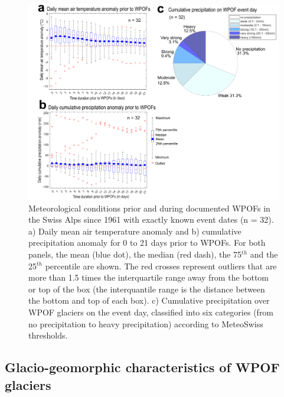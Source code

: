 \begin{figure}
    \centering
    \includegraphics[width=1\linewidth]{chapters/chapter_WPOFs/meteo_anomaly.pdf}
    \caption{Meteorological conditions prior and during documented WPOFs in the Swiss Alps since 1961 with exactly known event dates (n = 32). a) Daily mean air temperature anomaly and b) cumulative precipitation anomaly for 0 to 21 days prior to WPOFs. For both panels, the mean (blue dot), the median (red dash), the 75$^{th}$ and the 25$^{th}$ percentile are shown. The red crosses represent outliers that are more than 1.5 times the interquartile range away from the bottom or top of the box (the interquantile range is the distance between the bottom and top of each box). c) Cumulative precipitation over WPOF glaciers on the event day, classified into six categories (from no precipitation to heavy precipitation) according to MeteoSwiss thresholds.}
    \label{fig:mto_anomaly}
\end{figure}


\subsection{ Glacio-geomorphic characteristics of WPOF glaciers}
\label{sec:envelop_geo}


